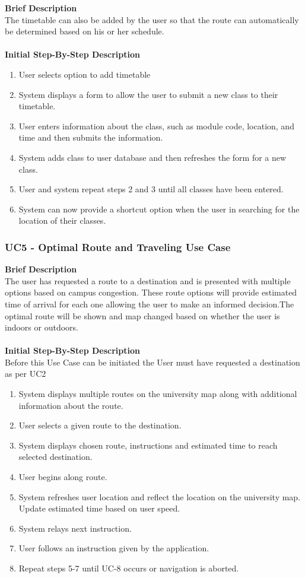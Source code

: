 \documentclass[a4paper, 12pt, one column, aas_macros]{article}
\begin{document}
\textbf{Brief Description}\\
The timetable can also be added by the user so that the route can automatically be determined based on his or her schedule.\\
\\\textbf{Initial Step-By-Step Description}\\
\begin{enumerate}
\item User selects option to add timetable
\item System displays a form to allow the user to submit a new class to their timetable.
\item User enters information about the class, such as module code, location, and time and then submits the information.
\item System adds class to user database and then refreshes the form for a new class.
\item User and system repeat steps 2 and 3 until all classes have been entered.
\item System can now provide a shortcut option when the user in searching for the location of their classes.
\end{enumerate}


\subsubsection{UC5 - Optimal Route and Traveling Use Case}
\textbf{Brief Description}\\
The user has requested a route to a destination and is presented with multiple options based on campus congestion. These route options will provide estimated time of arrival for each one allowing the user to make an informed decision.The optimal route will be shown and map changed based on whether the user is indoors or outdoors.\\
\\\textbf{Initial Step-By-Step Description}\\
Before this Use Case can be initiated the User must have requested a destination as per UC2
\begin{enumerate}
\item System displays multiple routes on the university map along with additional information about the route.
\item User selects a given route to the destination.
\item System displays chosen route, instructions and estimated time to reach selected  destination.
\item User begins along route.
\item System refreshes user location and reflect the location on the university map. Update estimated time based on user speed.
\item System relays next instruction.
\item User follows an instruction given by the application.
\item Repeat steps 5-7 until UC-8 occurs or navigation is aborted.
\end{enumerate}
\end{document}
